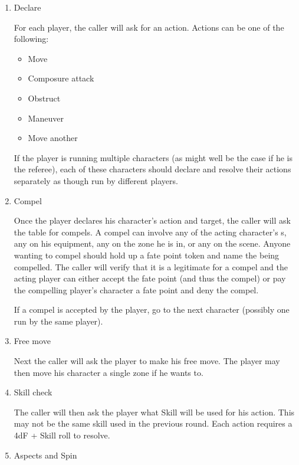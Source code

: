 \begin{enumerate}
 \item Declare

For each player, the caller will ask for an action. Actions can be one of the following:

\begin{itemize}
\item Move
\item Composure attack
\item Obstruct
\item Maneuver
\item Move another
\end{itemize}

If the player is running multiple characters (as might well be the case if he is the referee), each of these characters should declare and resolve their actions separately as though run by different players.

\item Compel

Once the player declares his character's action and target, the caller will ask the table for compels. A compel can involve any of the acting character's \Aspect{}s, any \Aspect{} on his equipment, any \Aspect{} on the zone he is in, or any \Aspect{} on the scene. Anyone wanting to compel should hold up a fate point token and name the \Aspect{} being compelled. The caller will verify that it is a legitimate \Aspect{} for a compel and the acting player can either accept the fate point (and thus the compel) or pay the compelling player's character a fate point and deny the compel.

If a compel is accepted by the player, go to the next character (possibly one run by the same player).

\item Free move

Next the caller will ask the player to make his free move. The player may then move his character a single zone if he wants to.

\item Skill check


The caller will then ask the player what Skill will be used for his action. This may not be the same skill used in the previous round.
Each action requires a 4dF + Skill roll to resolve. 

\item Aspects and Spin


\end{enumerate}
